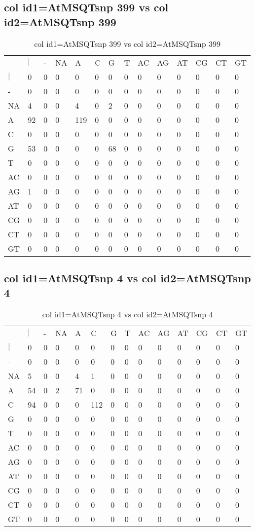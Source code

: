 \subsection{col id1=AtMSQTsnp 399 vs col id2=AtMSQTsnp 399}
\begin{center}
\begin{longtable}{|l|l|l|l|l|l|l|l|l|l|l|l|l|l|}
\caption{col id1=AtMSQTsnp 399 vs col id2=AtMSQTsnp 399} \label{table_dm914}\\
\hline
\\
\hline
&$|$&-&NA&A&C&G&T&AC&AG&AT&CG&CT&GT\\
$|$&0&0&0&0&0&0&0&0&0&0&0&0&0\\
-&0&0&0&0&0&0&0&0&0&0&0&0&0\\
NA&4&0&0&4&0&2&0&0&0&0&0&0&0\\
A&92&0&0&119&0&0&0&0&0&0&0&0&0\\
C&0&0&0&0&0&0&0&0&0&0&0&0&0\\
G&53&0&0&0&0&68&0&0&0&0&0&0&0\\
T&0&0&0&0&0&0&0&0&0&0&0&0&0\\
AC&0&0&0&0&0&0&0&0&0&0&0&0&0\\
AG&1&0&0&0&0&0&0&0&0&0&0&0&0\\
AT&0&0&0&0&0&0&0&0&0&0&0&0&0\\
CG&0&0&0&0&0&0&0&0&0&0&0&0&0\\
CT&0&0&0&0&0&0&0&0&0&0&0&0&0\\
GT&0&0&0&0&0&0&0&0&0&0&0&0&0\\
\hline
\end{longtable}
\end{center}

\subsection{col id1=AtMSQTsnp 4 vs col id2=AtMSQTsnp 4}
\begin{center}
\begin{longtable}{|l|l|l|l|l|l|l|l|l|l|l|l|l|l|}
\caption{col id1=AtMSQTsnp 4 vs col id2=AtMSQTsnp 4} \label{table_dm916}\\
\hline
\\
\hline
&$|$&-&NA&A&C&G&T&AC&AG&AT&CG&CT&GT\\
$|$&0&0&0&0&0&0&0&0&0&0&0&0&0\\
-&0&0&0&0&0&0&0&0&0&0&0&0&0\\
NA&5&0&0&4&1&0&0&0&0&0&0&0&0\\
A&54&0&2&71&0&0&0&0&0&0&0&0&0\\
C&94&0&0&0&112&0&0&0&0&0&0&0&0\\
G&0&0&0&0&0&0&0&0&0&0&0&0&0\\
T&0&0&0&0&0&0&0&0&0&0&0&0&0\\
AC&0&0&0&0&0&0&0&0&0&0&0&0&0\\
AG&0&0&0&0&0&0&0&0&0&0&0&0&0\\
AT&0&0&0&0&0&0&0&0&0&0&0&0&0\\
CG&0&0&0&0&0&0&0&0&0&0&0&0&0\\
CT&0&0&0&0&0&0&0&0&0&0&0&0&0\\
GT&0&0&0&0&0&0&0&0&0&0&0&0&0\\
\hline
\end{longtable}
\end{center}

